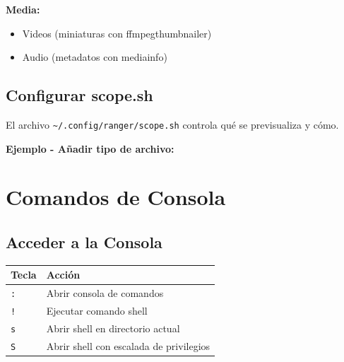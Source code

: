 \documentclass[
  doc,
  floatsintext,
  longtable,
  a4paper,
  nolmodern,
  notxfonts,
  notimes,
  12pt,
  colorlinks=true,linkcolor=blue,citecolor=blue,urlcolor=blue]{apa7}
\newenvironment{Shaded}{\begin{snugshade}}{\end{snugshade}}
\newcommand{\BuiltInTok}[1]{\textcolor[rgb]{0.00,0.23,0.31}{#1}}
\newcommand{\CommentTok}[1]{\textcolor[rgb]{0.37,0.37,0.37}{#1}}
\newcommand{\ControlFlowTok}[1]{\textcolor[rgb]{0.00,0.23,0.31}{\textbf{#1}}}
\newcommand{\ExtensionTok}[1]{\textcolor[rgb]{0.00,0.23,0.31}{#1}}
\newcommand{\FunctionTok}[1]{\textcolor[rgb]{0.28,0.35,0.67}{#1}}
\newcommand{\KeywordTok}[1]{\textcolor[rgb]{0.00,0.23,0.31}{\textbf{#1}}}
\newcommand{\NormalTok}[1]{\textcolor[rgb]{0.00,0.23,0.31}{#1}}
\newcommand{\SpecialStringTok}[1]{\textcolor[rgb]{0.13,0.47,0.30}{#1}}
\newcommand{\StringTok}[1]{\textcolor[rgb]{0.13,0.47,0.30}{#1}}
\newcommand{\VariableTok}[1]{\textcolor[rgb]{0.07,0.07,0.07}{#1}}
\providecommand{\tightlist}{%
  \setlength{\itemsep}{0pt}\setlength{\parskip}{0pt}}
\newcounter{none} %
\begin{document}
\textbf{Media:}

\begin{itemize}
\tightlist
\item
  Videos (miniaturas con ffmpegthumbnailer)
\item
  Audio (metadatos con mediainfo)
\end{itemize}

\subsection{Configurar scope.sh}\label{configurar-scope.sh}

El archivo \texttt{\textasciitilde{}/.config/ranger/scope.sh} controla
qué se previsualiza y cómo.

\textbf{Ejemplo - Añadir tipo de archivo:}

\begin{Shaded}
\end{Shaded}

\section{Comandos de Consola}\label{comandos-de-consola}

\subsection{Acceder a la Consola}\label{acceder-a-la-consola}

{\def\LTcaptype{none} %
\begin{longtable}[]{@{}ll@{}}
\toprule\noalign{}
Tecla & Acción \\
\midrule\noalign{}
\endhead
\bottomrule\noalign{}
\endlastfoot
\texttt{:} & Abrir consola de comandos \\
\texttt{!} & Ejecutar comando shell \\
\texttt{s} & Abrir shell en directorio actual \\
\texttt{S} & Abrir shell con escalada de privilegios \\
\end{longtable}
}
\end{document}
